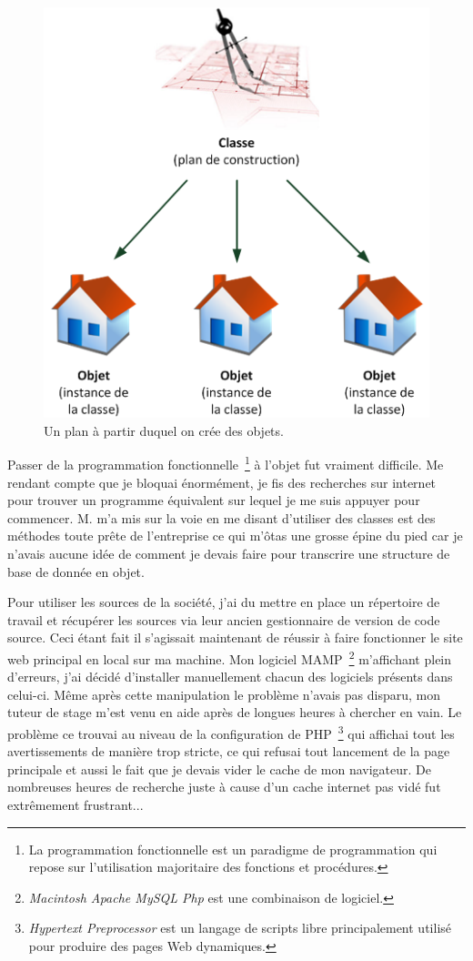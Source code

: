 \begin{figure}
\begin{center}
\includegraphics[scale=0.5]{images/objet.png}
\end{center}
\caption{Un plan à partir duquel on crée des objets.}
\end{figure}

Passer de la programmation fonctionnelle\, \footnote{La programmation
fonctionnelle est un paradigme de programmation qui repose sur l'utilisation
majoritaire des fonctions et procédures.} à l'objet fut vraiment difficile. Me
rendant compte que je bloquai énormément, je fis des recherches sur internet
pour trouver un programme équivalent sur lequel je me suis appuyer pour
commencer. M. m'a mis sur la voie en me disant d'utiliser des classes
est des méthodes toute prête de l'entreprise ce qui m'ôtas une grosse épine du
pied car je n'avais aucune idée de comment je devais faire pour transcrire une
structure de base de donnée en objet.

Pour utiliser les sources de la société, j'ai du mettre en place un répertoire
de travail et récupérer les sources via leur ancien gestionnaire de version de
code source.  Ceci étant fait il s'agissait maintenant de réussir à faire
fonctionner le site web principal en local sur ma machine. Mon logiciel MAMP\,
\footnote{\emph{Macintosh Apache MySQL Php} est une combinaison de logiciel.}
m'affichant plein d'erreurs, j'ai décidé d'installer manuellement chacun des
logiciels présents dans celui-ci.  Même après cette manipulation le problème
n'avais pas disparu, mon tuteur de stage m'est venu en aide après de longues
heures à chercher en vain. Le problème ce trouvai au niveau de la configuration
de PHP\, \footnote{\emph{Hypertext Preprocessor} est un langage de scripts
libre principalement utilisé pour produire des pages Web dynamiques.} qui
affichai tout les avertissements de manière trop stricte, ce qui refusai tout
lancement de la page principale et aussi le fait que je devais vider le cache
de mon navigateur. De nombreuses heures de recherche juste à cause d'un cache
internet pas vidé fut extrêmement frustrant...

